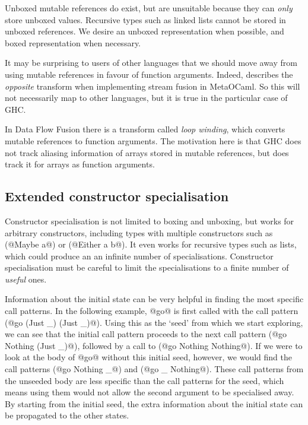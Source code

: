 Unboxed mutable references do exist, but are unsuitable because they can \emph{only} store unboxed values.
Recursive types such as linked lists cannot be stored in unboxed references.
We desire an unboxed representation when possible, and boxed representation when necessary.

It may be surprising to users of other languages that we should move away from using mutable references in favour of function arguments.
Indeed, \citet{biboudis2017expressive} describes the \emph{opposite} transform when implementing stream fusion in MetaOCaml.
So this will not necessarily map to other languages, but it is true in the particular case of GHC.

In Data Flow Fusion \cite{lippmeier2013data} there is a transform called \emph{loop winding}, which converts mutable references to function arguments.
The motivation here is that GHC does not track aliasing information of arrays stored in mutable references, but does track it for arrays as function arguments.

\subsection{Extended constructor specialisation}

Constructor specialisation is not limited to boxing and unboxing, but works for arbitrary constructors, including types with multiple constructors such as (@Maybe a@) or (@Either a b@).
It even works for recursive types such as lists, which could produce an an infinite number of specialisations.
Constructor specialisation must be careful to limit the specialisations to a finite number of \emph{useful} ones.

Information about the initial state can be very helpful in finding the most specific call patterns.
In the following example, @go@ is first called with the call pattern (@go (Just _) (Just _)@).
Using this as the `seed' from which we start exploring, we can see that the initial call pattern proceeds to the next call pattern (@go Nothing (Just _)@), followed by a call to (@go Nothing Nothing@).
If we were to look at the body of @go@ without this initial seed, however, we would find the call patterns (@go Nothing _@) and (@go _ Nothing@).
These call patterns from the unseeded body are less specific than the call patterns for the seed, which means using them would not allow the second argument to be specialised away.
By starting from the initial seed, the extra information about the initial state can be propagated to the other states.

